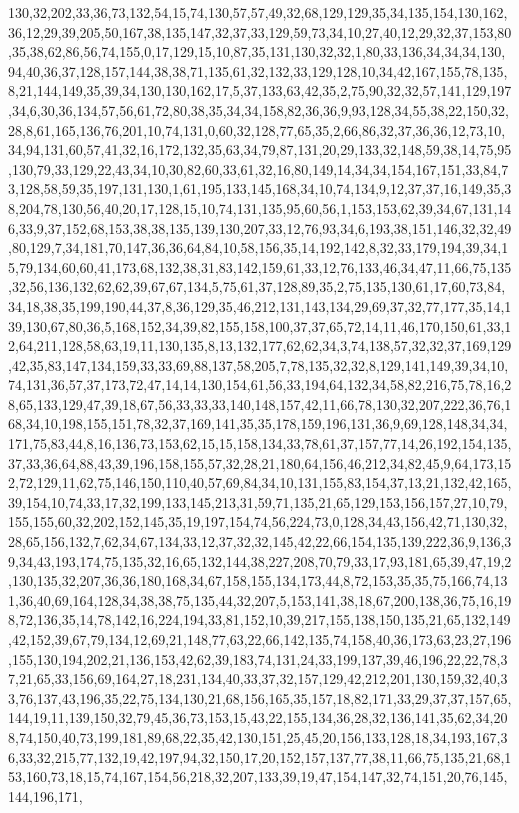 \documentclass[11pt]{article}
\begin{document}
\begin{vncode}
130,32,202,33,36,73,132,54,15,74,130,57,57,49,32,68,129,129,35,34,135,154,130,162,36,12,29,39,205,50,167,38,135,147,32,37,33,129,59,73,34,10,27,40,12,29,32,37,153,80,35,38,62,86,56,74,155,0,17,129,15,10,87,35,131,130,32,32,1,80,33,136,34,34,34,130,94,40,36,37,128,157,144,38,38,71,135,61,32,132,33,129,128,10,34,42,167,155,78,135,8,21,144,149,35,39,34,130,130,162,17,5,37,133,63,42,35,2,75,90,32,32,57,141,129,197,34,6,30,36,134,57,56,61,72,80,38,35,34,34,158,82,36,36,9,93,128,34,55,38,22,150,32,28,8,61,165,136,76,201,10,74,131,0,60,32,128,77,65,35,2,66,86,32,37,36,36,12,73,10,34,94,131,60,57,41,32,16,172,132,35,63,34,79,87,131,20,29,133,32,148,59,38,14,75,95,130,79,33,129,22,43,34,10,30,82,60,33,61,32,16,80,149,14,34,34,154,167,151,33,84,73,128,58,59,35,197,131,130,1,61,195,133,145,168,34,10,74,134,9,12,37,37,16,149,35,38,204,78,130,56,40,20,17,128,15,10,74,131,135,95,60,56,1,153,153,62,39,34,67,131,146,33,9,37,152,68,153,38,38,135,139,130,207,33,12,76,93,34,6,193,38,151,146,32,32,49,80,129,7,34,181,70,147,36,36,64,84,10,58,156,35,14,192,142,8,32,33,179,194,39,34,15,79,134,60,60,41,173,68,132,38,31,83,142,159,61,33,12,76,133,46,34,47,11,66,75,135,32,56,136,132,62,62,39,67,67,134,5,75,61,37,128,89,35,2,75,135,130,61,17,60,73,84,34,18,38,35,199,190,44,37,8,36,129,35,46,212,131,143,134,29,69,37,32,77,177,35,14,139,130,67,80,36,5,168,152,34,39,82,155,158,100,37,37,65,72,14,11,46,170,150,61,33,12,64,211,128,58,63,19,11,130,135,8,13,132,177,62,62,34,3,74,138,57,32,32,37,169,129,42,35,83,147,134,159,33,33,69,88,137,58,205,7,78,135,32,32,8,129,141,149,39,34,10,74,131,36,57,37,173,72,47,14,14,130,154,61,56,33,194,64,132,34,58,82,216,75,78,16,28,65,133,129,47,39,18,67,56,33,33,33,140,148,157,42,11,66,78,130,32,207,222,36,76,168,34,10,198,155,151,78,32,37,169,141,35,35,178,159,196,131,36,9,69,128,148,34,34,171,75,83,44,8,16,136,73,153,62,15,15,158,134,33,78,61,37,157,77,14,26,192,154,135,37,33,36,64,88,43,39,196,158,155,57,32,28,21,180,64,156,46,212,34,82,45,9,64,173,152,72,129,11,62,75,146,150,110,40,57,69,84,34,10,131,155,83,154,37,13,21,132,42,165,39,154,10,74,33,17,32,199,133,145,213,31,59,71,135,21,65,129,153,156,157,27,10,79,155,155,60,32,202,152,145,35,19,197,154,74,56,224,73,0,128,34,43,156,42,71,130,32,28,65,156,132,7,62,34,67,134,33,12,37,32,32,145,42,22,66,154,135,139,222,36,9,136,39,34,43,193,174,75,135,32,16,65,132,144,38,227,208,70,79,33,17,93,181,65,39,47,19,2,130,135,32,207,36,36,180,168,34,67,158,155,134,173,44,8,72,153,35,35,75,166,74,131,36,40,69,164,128,34,38,38,75,135,44,32,207,5,153,141,38,18,67,200,138,36,75,16,198,72,136,35,14,78,142,16,224,194,33,81,152,10,39,217,155,138,150,135,21,65,132,149,42,152,39,67,79,134,12,69,21,148,77,63,22,66,142,135,74,158,40,36,173,63,23,27,196,155,130,194,202,21,136,153,42,62,39,183,74,131,24,33,199,137,39,46,196,22,22,78,37,21,65,33,156,69,164,27,18,231,134,40,33,37,32,157,129,42,212,201,130,159,32,40,33,76,137,43,196,35,22,75,134,130,21,68,156,165,35,157,18,82,171,33,29,37,37,157,65,144,19,11,139,150,32,79,45,36,73,153,15,43,22,155,134,36,28,32,136,141,35,62,34,208,74,150,40,73,199,181,89,68,22,35,42,130,151,25,45,20,156,133,128,18,34,193,167,36,33,32,215,77,132,19,42,197,94,32,150,17,20,152,157,137,77,38,11,66,75,135,21,68,153,160,73,18,15,74,167,154,56,218,32,207,133,39,19,47,154,147,32,74,151,20,76,145,144,196,171,
\end{vncode}
\end{document}
